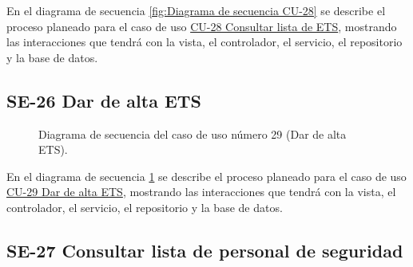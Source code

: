 En el diagrama de secuencia \ref{fig:Diagrama de secuencia CU-28} se describe el proceso planeado para el caso de uso \hyperlink{CU-28}{CU-28 Consultar lista de ETS}, mostrando las interacciones que tendrá con la vista, el controlador, el servicio, el repositorio y la base de datos.

\newpage

\subsection{SE-26 Dar de alta ETS}

\begin{figure}[htbp!]
	\begin{center}
		\caption{Diagrama de secuencia del caso de uso número 29 (Dar de alta ETS).}
		\label{fig:Diagrama de secuencia CU-29}
	\end{center}
\end{figure}

En el diagrama de secuencia \ref{fig:Diagrama de secuencia CU-29} se describe el proceso planeado para el caso de uso \hyperlink{CU-29}{CU-29 Dar de alta ETS}, mostrando las interacciones que tendrá con la vista, el controlador, el servicio, el repositorio y la base de datos.

\newpage

\subsection{SE-27 Consultar lista de personal de seguridad}

